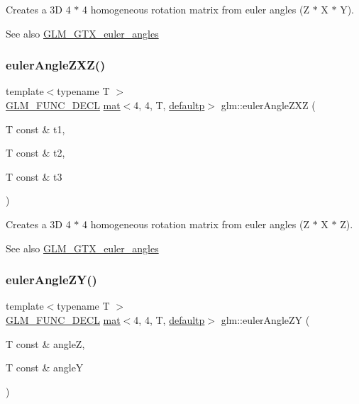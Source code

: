 Creates a 3D 4 $\ast$ 4 homogeneous rotation matrix from euler angles (Z $\ast$ X $\ast$ Y). \begin{DoxySeeAlso}{See also}
\hyperlink{group__gtx__euler__angles}{G\+L\+M\+\_\+\+G\+T\+X\+\_\+euler\+\_\+angles} 
\end{DoxySeeAlso}
\mbox{\label{group__gtx__euler__angles_ga178f966c52b01e4d65e31ebd007e3247}} 
\subsubsection{\texorpdfstring{euler\+Angle\+Z\+X\+Z()}{eulerAngleZXZ()}}
{\footnotesize\ttfamily template$<$typename T $>$ \\
\hyperlink{setup_8hpp_ab2d052de21a70539923e9bcbf6e83a51}{G\+L\+M\+\_\+\+F\+U\+N\+C\+\_\+\+D\+E\+CL} \hyperlink{structglm_1_1mat}{mat}$<$4, 4, T, \hyperlink{namespaceglm_a36ed105b07c7746804d7fdc7cc90ff25a9d21ccd8b5a009ec7eb7677befc3bf51}{defaultp}$>$ glm\+::euler\+Angle\+Z\+XZ (\begin{DoxyParamCaption}\item[{T const \&}]{t1,  }\item[{T const \&}]{t2,  }\item[{T const \&}]{t3 }\end{DoxyParamCaption})}

Creates a 3D 4 $\ast$ 4 homogeneous rotation matrix from euler angles (Z $\ast$ X $\ast$ Z). \begin{DoxySeeAlso}{See also}
\hyperlink{group__gtx__euler__angles}{G\+L\+M\+\_\+\+G\+T\+X\+\_\+euler\+\_\+angles} 
\end{DoxySeeAlso}
\mbox{\label{group__gtx__euler__angles_ga400b2bd5984999efab663f3a68e1d020}} 
\subsubsection{\texorpdfstring{euler\+Angle\+Z\+Y()}{eulerAngleZY()}}
{\footnotesize\ttfamily template$<$typename T $>$ \\
\hyperlink{setup_8hpp_ab2d052de21a70539923e9bcbf6e83a51}{G\+L\+M\+\_\+\+F\+U\+N\+C\+\_\+\+D\+E\+CL} \hyperlink{structglm_1_1mat}{mat}$<$4, 4, T, \hyperlink{namespaceglm_a36ed105b07c7746804d7fdc7cc90ff25a9d21ccd8b5a009ec7eb7677befc3bf51}{defaultp}$>$ glm\+::euler\+Angle\+ZY (\begin{DoxyParamCaption}\item[{T const \&}]{angleZ,  }\item[{T const \&}]{angleY }\end{DoxyParamCaption})}

